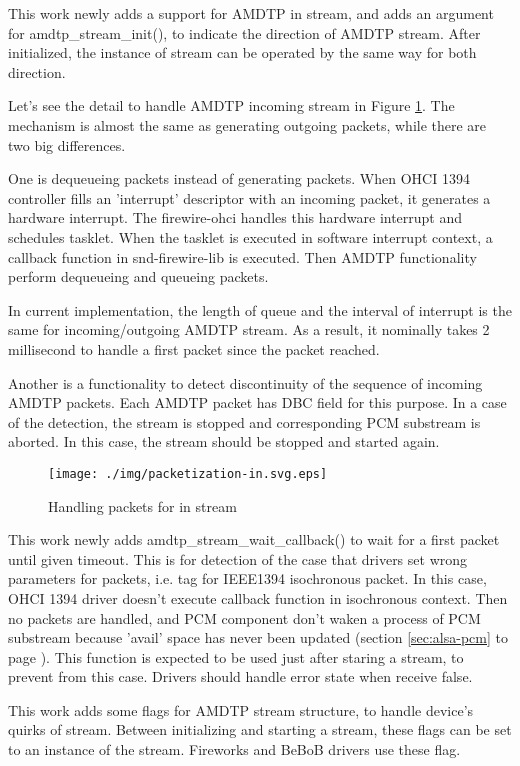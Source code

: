 \documentclass[onecolumn]{article}
\begin{document}
This work newly adds a support for AMDTP in stream, and adds an argument for amdtp\_stream\_init(), to indicate the direction of AMDTP stream. After initialized, the instance of stream can be operated by the same way for both direction.

Let's see the detail to handle AMDTP incoming stream in Figure \ref{fig:packetization-in}. The mechanism is almost the same as generating outgoing packets, while there are two big differences.

One is dequeueing packets instead of generating packets. When OHCI 1394 controller fills an 'interrupt' descriptor with an incoming packet, it generates a hardware interrupt. The firewire-ohci handles this hardware interrupt and schedules tasklet. When the tasklet is executed in software interrupt context, a callback function in snd-firewire-lib is executed. Then AMDTP functionality perform dequeueing and queueing packets.

In current implementation, the length of queue and the interval of interrupt is the same for incoming/outgoing AMDTP stream. As a result, it nominally takes 2 millisecond to handle a first packet since the packet reached.

Another is a functionality to detect discontinuity of the sequence of incoming AMDTP packets. Each AMDTP packet has DBC field for this purpose. In a case of the detection, the stream is stopped and corresponding PCM substream is aborted. In this case, the stream should be stopped and started again.

\begin{figure}[H]
	\centering
	\texttt{[image: ./img/packetization-in.svg.eps]}
	\caption{{Handling packets for in stream}}
	\label{fig:packetization-in}
\end{figure}

This work newly adds amdtp\_stream\_wait\_callback() to wait for a first packet until given timeout. This is for detection of the case that drivers set wrong parameters for packets, i.e. tag for IEEE1394 isochronous packet. In this case, OHCI 1394 driver doesn't execute callback function in isochronous context. Then no packets are handled, and PCM component don't waken a process of PCM substream because 'avail' space has never been updated (section \ref{sec:alsa-pcm} to page \pageref{sec:alsa-pcm}). This function is expected to be used just after staring a stream, to prevent from this case. Drivers should handle error state when receive false.

This work adds some flags for AMDTP stream structure, to handle device's quirks of stream. Between initializing and starting a stream, these flags can be set to an instance of the stream. Fireworks and BeBoB drivers use these flag.
\end{document}
